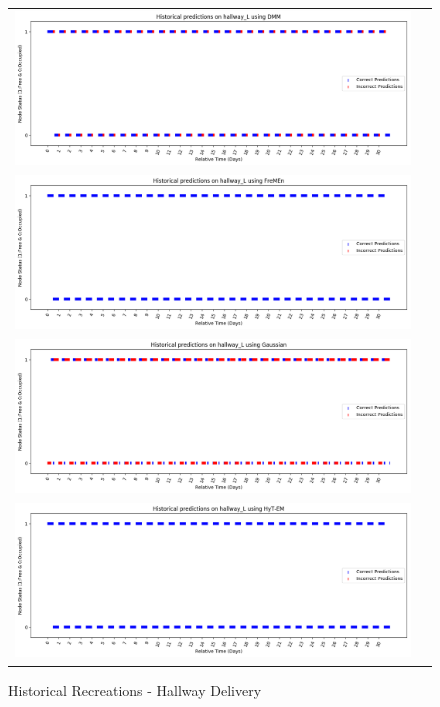 \begin{center}
\begin{figure}[!Hp]
  \begin{tabular}{cc}
    {\includegraphics[width = 6in]{images/results/Historical_hallway_L_DMM.png}} \\
    {\includegraphics[width = 6in]{images/results/Historical_hallway_L_FreMEn.png}} \\
    {\includegraphics[width = 6in]{images/results/Historical_hallway_L_Gaussian.png}} \\
    {\includegraphics[width = 6in]{images/results/Historical_hallway_L_HyT-EM.png}} \\
  \end{tabular}
  \caption{Historical Recreations - Hallway Delivery}
\end{figure}


\end{center}
